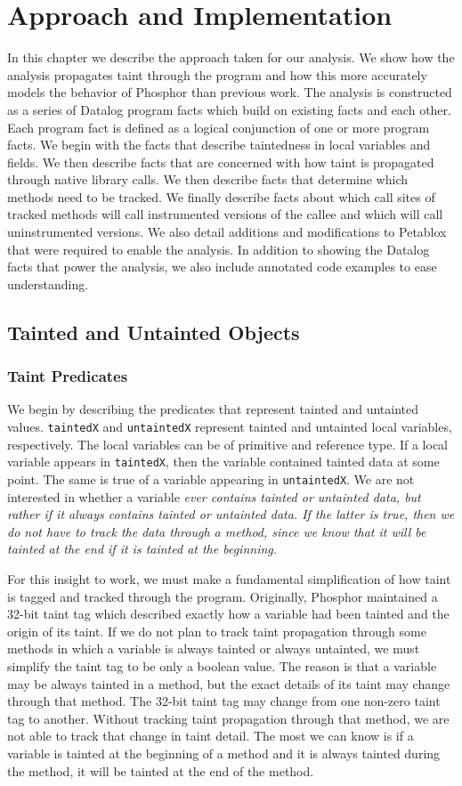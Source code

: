 \chapter{Approach and Implementation}
In this chapter we describe the approach taken for our analysis. We show how the analysis propagates taint through the program and how this more accurately models the behavior of Phosphor than previous work. The analysis is constructed as a series of Datalog program facts which build on existing facts and each other. Each program fact is defined as a logical conjunction of one or more program facts. We begin with the facts that describe taintedness in local variables and fields. We then describe facts that are concerned with how taint is propagated through native library calls. We then describe facts that determine which methods need to be tracked. We finally describe facts about which call sites of tracked methods will call instrumented versions of the callee and which will call uninstrumented versions. We also detail additions and modifications to Petablox that were required to enable the analysis. In addition to showing the Datalog facts that power the analysis, we also include annotated code examples to ease understanding.
\section{Tainted and Untainted Objects}
\subsection{Taint Predicates}
We begin by describing the predicates that represent tainted and untainted values. \texttt{taintedX} and \texttt{untaintedX} represent tainted and untainted local variables, respectively. The local variables can be of primitive and reference type. If a local variable appears in \texttt{taintedX}, then the variable contained tainted data at some point. The same is true of a variable appearing in \texttt{untaintedX}. We are not interested in whether a variable \em{ever} contains tainted or untainted data, but rather if it \em{always} contains tainted or untainted data. If the latter is true, then we do not have to track the data through a method, since we know that it will be tainted at the end if it is tainted at the beginning.

For this insight to work, we must make a fundamental simplification of how taint is tagged and tracked through the program. Originally, Phosphor maintained a 32-bit taint tag which described exactly how a variable had been tainted and the origin of its taint. If we do not plan to track taint propagation through some methods in which a variable is always tainted or always untainted, we must simplify the taint tag to be only a boolean value. The reason is that a variable may be always tainted in a method, but the exact details of its taint may change through that method. The 32-bit taint tag may change from one non-zero taint tag to another. Without tracking taint propagation through that method, we are not able to track that change in taint detail. The most we can know is if a variable is tainted at the beginning of a method and it is always tainted during the method, it will be tainted at the end of the method.

